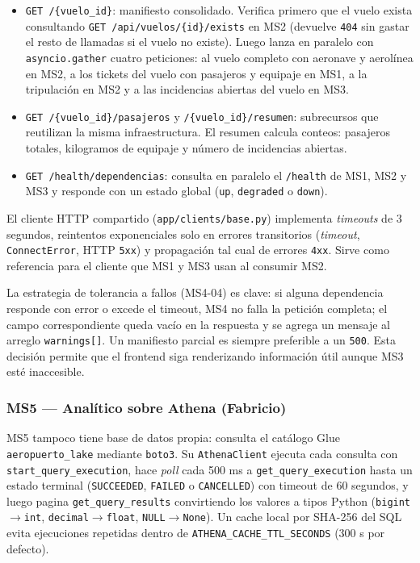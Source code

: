 \begin{itemize}
  \item \texttt{GET /\{vuelo\_id\}}: manifiesto consolidado. Verifica
    primero que el vuelo exista consultando
    \texttt{GET /api/vuelos/\{id\}/exists} en MS2 (devuelve
    \texttt{404} sin gastar el resto de llamadas si el vuelo no existe).
    Luego lanza en paralelo con \texttt{asyncio.gather} cuatro
    peticiones: al vuelo completo con aeronave y aerolínea en MS2, a los
    tickets del vuelo con pasajeros y equipaje en MS1, a la tripulación
    en MS2 y a las incidencias abiertas del vuelo en MS3.
  \item \texttt{GET /\{vuelo\_id\}/pasajeros} y
    \texttt{/\{vuelo\_id\}/resumen}: subrecursos que reutilizan la misma
    infraestructura. El resumen calcula conteos: pasajeros totales,
    kilogramos de equipaje y número de incidencias abiertas.
  \item \texttt{GET /health/dependencias}: consulta en paralelo el
    \texttt{/health} de MS1, MS2 y MS3 y responde con un estado global
    (\texttt{up}, \texttt{degraded} o \texttt{down}).
\end{itemize}

El cliente HTTP compartido (\texttt{app/clients/base.py}) implementa
\emph{timeouts} de 3 segundos, reintentos exponenciales solo en errores
transitorios (\emph{timeout}, \texttt{ConnectError}, HTTP \texttt{5xx})
y propagación tal cual de errores \texttt{4xx}. Sirve como referencia
para el cliente que MS1 y MS3 usan al consumir MS2.

La estrategia de tolerancia a fallos (MS4-04) es clave: si alguna
dependencia responde con error o excede el timeout, MS4 no falla la
petición completa; el campo correspondiente queda vacío en la respuesta
y se agrega un mensaje al arreglo \texttt{warnings[]}. Un manifiesto
parcial es siempre preferible a un \texttt{500}. Esta decisión permite
que el frontend siga renderizando información útil aunque MS3 esté
inaccesible.

\subsubsection{MS5 --- Analítico sobre Athena (Fabricio)}
MS5 tampoco tiene base de datos propia: consulta el catálogo Glue
\texttt{aeropuerto\_lake} mediante \texttt{boto3}. Su
\texttt{AthenaClient} ejecuta cada consulta con
\texttt{start\_query\_execution}, hace \emph{poll} cada 500 ms a
\texttt{get\_query\_execution} hasta un estado terminal
(\texttt{SUCCEEDED}, \texttt{FAILED} o \texttt{CANCELLED}) con timeout
de 60 segundos, y luego pagina \texttt{get\_query\_results}
convirtiendo los valores a tipos Python (\texttt{bigint}$\to$\texttt{int},
\texttt{decimal}$\to$\texttt{float}, \texttt{NULL}$\to$\texttt{None}).
Un cache local por SHA-256 del SQL evita ejecuciones repetidas dentro
de \texttt{ATHENA\_CACHE\_TTL\_SECONDS} (300 s por defecto).

